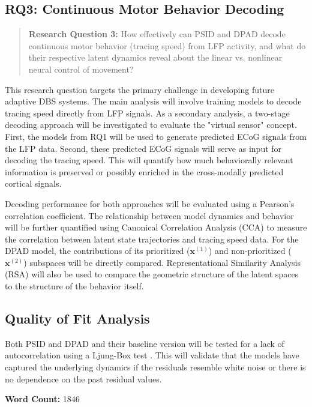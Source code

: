 \documentclass[12pt, letterpaper]{article}
\begin{document}
\subsection{RQ3: Continuous Motor Behavior Decoding}
\begin{quote}
    \textbf{Research Question 3:} How effectively can PSID and DPAD decode continuous motor behavior (tracing speed) from LFP activity, and what do their respective latent dynamics reveal about the linear vs. nonlinear neural control of movement?
\end{quote}

This research question targets the primary challenge in developing future adaptive DBS systems. The main analysis will involve training models to decode tracing speed directly from LFP signals. As a secondary analysis, a two-stage decoding approach will be investigated to evaluate the "virtual sensor" concept. First, the models from RQ1 will be used to generate predicted ECoG signals from the LFP data. Second, these predicted ECoG signals will serve as input for decoding the tracing speed. This will quantify how much behaviorally relevant information is preserved or possibly enriched in the cross-modally predicted cortical signals.

Decoding performance for both approaches will be evaluated using a Pearson's correlation coefficient. The relationship between model dynamics and behavior will be further quantified using Canonical Correlation Analysis (CCA) to measure the correlation between latent state trajectories and tracing speed data. For the DPAD model, the contributions of its prioritized ($\mathbf{x}^{(1)}$) and non-prioritized ($\mathbf{x}^{(2)}$) subspaces will be directly compared. Representational Similarity Analysis (RSA) will also be used to compare the geometric structure of the latent spaces to the structure of the behavior itself.

\subsection{Quality of Fit Analysis}
Both PSID and DPAD and their baseline version will be tested for a lack of autocorrelation using a Ljung-Box test \parencite{ljungMeasureLackFit1978}. This will validate that the models have captured the underlying dynamics if the residuals resemble white noise or there is no dependence on the past residual values.

\vspace{1em}
\noindent\textbf{Word Count:} 1846
\newpage
\end{document}
